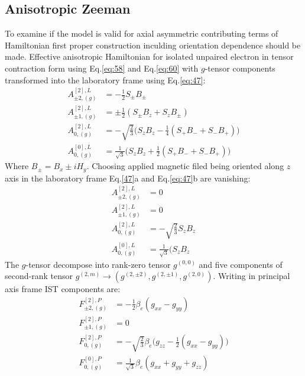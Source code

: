 \subsection{Anisotropic Zeeman}
To examine if the model is valid for axial asymmetric contributing terms of Hamiltonian first proper construction inculding orientation dependence should be made. Effective anisotropic Hamiltonian for isolated unpaired electron in tensor contraction form using Eq.\ref{eq:58} and Eq.\ref{eq:60} with $g$-tensor components transformed into the laboratory frame\cite{NMRtomograph}\cite{Nordio} using Eq.\ref{eq:47}:
\begin{subequations}\label{eq:48}
\begin{align}
A^{[2],L}_{\pm2,(g)} & =-\frac{1}{2}S_{\pm}B_{\pm}\\
A^{[2],L}_{\pm1,(g)} & =\pm\frac{1}{2}(S_{\pm}B_{z}+S_zB_{\pm})\\
A^{[2],L}_{0,(g)} & =-\sqrt{\frac{2}{3}}\big(S_{z}B_{z}-\frac{1}{4}(S_+B_-+S_-B_+)\big)\\
A^{[0],L}_{0,(g)} & =\frac{1}{\sqrt{3}}\big(S_{z}B_{z}+\frac{1}{2}(S_+B_-+S_-B_+)\big)
\end{align}
\end{subequations}
Where $B_{\pm}=B_x\pm iH_y$. Choosing applied magnetic filed being oriented along $z$ axis in the laboratory frame  Eq.\ref{47}a and Eq.\ref{eq:47}b are vanishing: 
\begin{subequations}\label{eq:49}
\begin{align}
A^{[2],L}_{\pm2,(g)} & =0\\
A^{[2],L}_{\pm1,(g)} & =0\\
A^{[2],L}_{0,(g)} & =-\sqrt{\frac{2}{3}}S_{z}B_{z}\\
A^{[0],L}_{0,(g)} & = \frac{1}{\sqrt{3}}(S_{z}B_{z}
\end{align}
\end{subequations}
The $g$-tensor decompose into rank-zero tensor $g^{(0,0)}$ and five components of second-rank tensor $g^{(2,m)}\rightarrow(g^{(2,\pm2)}, g^{(2,\pm1)},g^{(2,0)})$. Writing in principal axis frame IST components are: 
\begin{subequations}\label{eq:50}
\begin{align}
F^{[2],P}_{\pm2,(g)} & =-\frac{1}{2}\beta_e(g_{xx}-g_{yy})\\
F^{[2],P}_{\pm1,(g)} & =0\\
F^{[2],P}_{0,(g)} & =-\sqrt{\frac{2}{3}}\beta_e\big(g_{zz}-\frac{1}{2}(g_{xx}-g_{yy})\big)\\
F^{[0],P}_{0,(g)} & = \frac{1}{\sqrt{3}}\beta_e(g_{xx}+g_{yy}+g_{zz})
\end{align}
\end{subequations}
